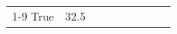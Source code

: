 \begin{table}[H]
{\begin{tabular}{lllrlllll}
 \\
\cline{1-9}
True & 32.5%

\end{tabular}}
\end{table}
